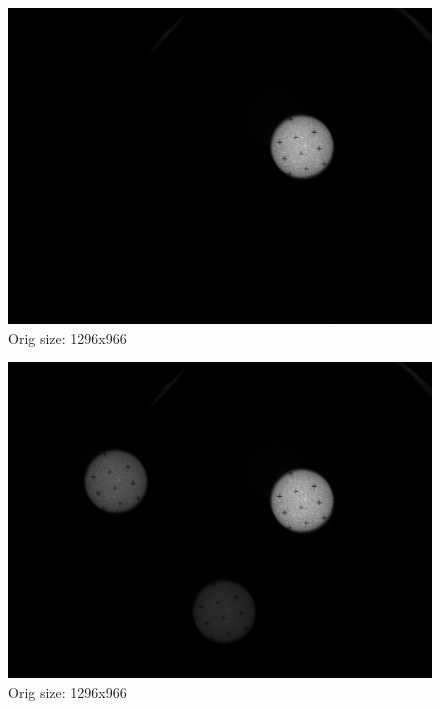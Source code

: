 \documentclass[10pt]{scrartcl}
\begin{document}
\begin{figure}[!ht]
    \centering
    \includegraphics[width=.9\textwidth]{../plots_tables_images/albsun.jpg}    
    \caption{Orig size: 1296x966}
\end{figure}

\begin{figure}[!ht]
    \centering
    \includegraphics[width=.9\textwidth]{../plots_tables_images/tritest.jpg}    
    \caption{Orig size: 1296x966}
\end{figure}
\end{document}
